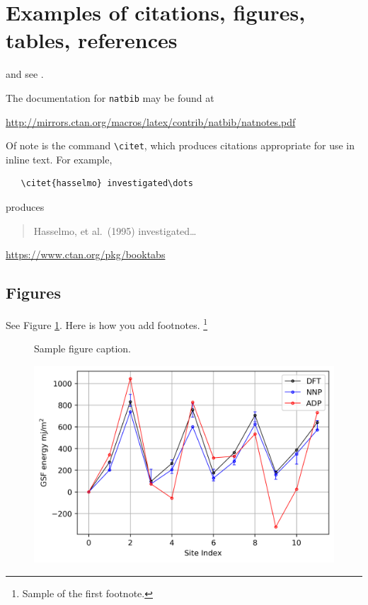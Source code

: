 \documentclass{article}
\begin{document}
\section{Examples of citations, figures, tables, references}
\label{sec:others}
\lipsum[8] \cite{kour2014real,kour2014fast} and see \cite{hadash2018estimate}.

The documentation for \verb+natbib+ may be found at
\begin{center}
  \url{http://mirrors.ctan.org/macros/latex/contrib/natbib/natnotes.pdf}
\end{center}
Of note is the command \verb+\citet+, which produces citations
appropriate for use in inline text.  For example,
\begin{verbatim}
   \citet{hasselmo} investigated\dots
\end{verbatim}
produces
\begin{quote}
  Hasselmo, et al.\ (1995) investigated\dots
\end{quote}

\begin{center}
  \url{https://www.ctan.org/pkg/booktabs}
\end{center}


\subsection{Figures}
\lipsum[10] 
See Figure \ref{fig:fig1}. Here is how you add footnotes. \footnote{Sample of the first footnote.}
\lipsum[11] 

\begin{figure}
  \centering
  \fbox{\rule[-.5cm]{4cm}{4cm} \rule[-.5cm]{4cm}{0cm}}
  \caption{Sample figure caption.}
  \label{fig:fig1}
\end{figure}

\begin{figure} %
    \centering
    \includegraphics{figures/NOTINOQMD_00002-GSF_111.png}
\end{figure}
\end{document}
